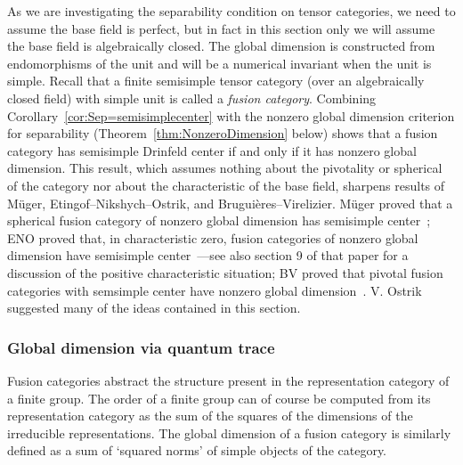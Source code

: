 \documentclass{amsart}
\begin{document}
As we are investigating the separability condition on tensor categories, we need to assume the base field is perfect, but in fact in this section only we will assume the base field is algebraically closed.  The global dimension is constructed from endomorphisms of the unit and will be a numerical invariant when the unit is simple.  Recall that a finite semisimple tensor category (over an algebraically closed field) with simple unit is called a \emph{fusion category}.  Combining Corollary~\ref{cor:Sep=semisimplecenter} with the nonzero global dimension criterion for separability (Theorem~\ref{thm:NonzeroDimension} below) shows that a fusion category has semisimple Drinfeld center if and only if it has nonzero global dimension.  This result, which assumes nothing about the pivotality or spherical of the category nor about the characteristic of the base field, sharpens results of M\"uger, Etingof--Nikshych--Ostrik, and Brugui\`eres--Virelizier.  M\"uger proved that a spherical fusion category of nonzero global dimension has semisimple center~\cite[Prop. 3.10]{MR1966525}; ENO proved that, in characteristic zero, fusion categories of nonzero global dimension have semisimple center~\cite[Thm. 2.15]{MR2183279}---see also section 9 of that paper for a discussion of the positive characteristic situation; BV proved that pivotal fusion categories with semsimple center have nonzero global dimension~\cite{MR3079759}.  V. Ostrik suggested many of the ideas contained in this section.

\subsubsection{Global dimension via quantum trace} \label{sec:gdim}

Fusion categories abstract the structure present in the representation category of a finite group.  The order of a finite group can of course be computed from its representation category as the sum of the squares of the dimensions of the irreducible representations.  The global dimension of a fusion category is similarly defined as a sum of `squared norms' of simple objects of the category.  
\end{document}
